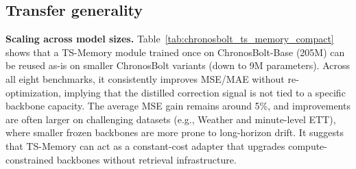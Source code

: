 \subsection{Transfer generality}
\label{sec:transfer_generality}




\noindent\textbf{Scaling across model sizes.}
\label{sec:transfer_scaling_model_sizes}
Table~\ref{tab:chronosbolt_ts_memory_compact} shows that a TS-Memory module trained once on ChronosBolt-Base (205M) can be reused as-is on smaller ChronosBolt variants (down to 9M parameters). Across all eight benchmarks, it consistently improves MSE/MAE without re-optimization, implying that the distilled correction signal is not tied to a specific backbone capacity. The average MSE gain remains around 5\%, and improvements are often larger on challenging datasets (e.g., Weather and minute-level ETT), where smaller frozen backbones are more prone to long-horizon drift. It suggests that TS-Memory can act as a constant-cost adapter that upgrades compute-constrained backbones without retrieval infrastructure.

